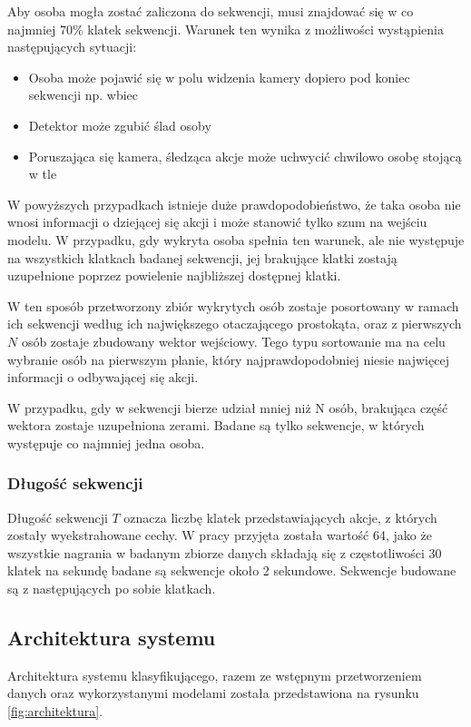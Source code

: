 Aby osoba mogła zostać zaliczona do sekwencji, musi znajdować się w co najmniej 70\% klatek sekwencji. Warunek ten 
wynika z możliwości wystąpienia następujących sytuacji: \begin{itemize} 
\item Osoba może pojawić się w polu widzenia kamery dopiero pod koniec sekwencji np. wbiec
\item Detektor może zgubić ślad osoby
\item Poruszająca się kamera, śledząca akcje może uchwycić chwilowo osobę stojącą w tle 
\end{itemize} 
W powyższych przypadkach istnieje duże prawdopodobieństwo, że taka osoba nie wnosi informacji o dziejącej się akcji i może stanowić 
tylko szum na wejściu modelu. W przypadku, gdy wykryta osoba spełnia ten warunek, ale nie występuje na wszystkich 
klatkach badanej sekwencji, jej brakujące klatki zostają uzupełnione poprzez powielenie najbliższej dostępnej klatki. 

W ten sposób przetworzony 
zbiór wykrytych osób zostaje posortowany w ramach ich sekwencji według ich największego otaczającego prostokąta, oraz 
z pierwszych $N$ osób zostaje zbudowany wektor wejściowy. Tego typu sortowanie ma na celu wybranie osób na pierwszym  
planie, który najprawdopodobniej niesie najwięcej informacji o odbywającej się akcji. 

W przypadku, gdy w sekwencji bierze udział mniej niż N osób, brakująca część wektora zostaje uzupełniona zerami. Badane
są tylko sekwencje, w których występuje co najmniej jedna osoba. 

\subsubsection{Długość sekwencji}
Długość sekwencji $T$ oznacza liczbę klatek przedstawiających akcje, z których zostały wyekstrahowane cechy. W pracy przyjęta została wartość 64, jako że wszystkie nagrania w badanym zbiorze danych składają się z częstotliwości 30 klatek na sekundę badane są sekwencje około 2 sekundowe. Sekwencje budowane są z następujących po sobie klatkach. 

\subsection{Architektura systemu}
Architektura systemu klasyfikującego, razem ze wstępnym przetworzeniem danych oraz wykorzystanymi modelami została przedstawiona na rysunku \ref{fig:architektura}.

